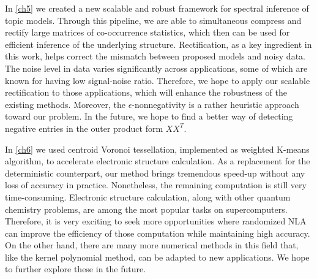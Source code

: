In \cref{ch5} we created a new scalable and robust framework for spectral
inference of topic models. Through this pipeline, we are able to simultaneous
compress and rectify large matrices of co\hyp{}occurrence statistics, which then
can be used for efficient inference of the underlying structure. Rectification,
as a key ingredient in this work, helps correct the mismatch between proposed
models and noisy data. The noise level in data varies significantly across
applications, some of which are known for having low signal\hyp{}noise ratio.
Therefore, we hope to apply our scalable rectification to those applications,
which will enhance the robustness of the existing methods. Moreover, the 
$\epsilon$\hyp{}nonnegativity is a rather heuristic approach toward our problem.
In the future, we hope to find a better way of detecting negative entries in the
outer product form $XX^T$.


In \cref{ch6} we used centroid Voronoi tessellation, implemented as weighted 
K\hyp{}means algorithm, to accelerate electronic structure calculation. As a
replacement for the deterministic counterpart, our method brings tremendous
speed\hyp{}up without any loss of accuracy in practice. Nonetheless, the
remaining computation is still very time\hyp{}consuming. Electronic structure
calculation, along with other quantum chemistry problems, are among the most
popular tasks on supercomputers. Therefore, it is very exciting to seek more
opportunities where randomized NLA can improve the efficiency of those
computation while maintaining high accuracy. On the other hand, there are many
more numerical methods in this field that, like the kernel polynomial method,
can be adapted to new applications. We hope to further explore these in the
future.